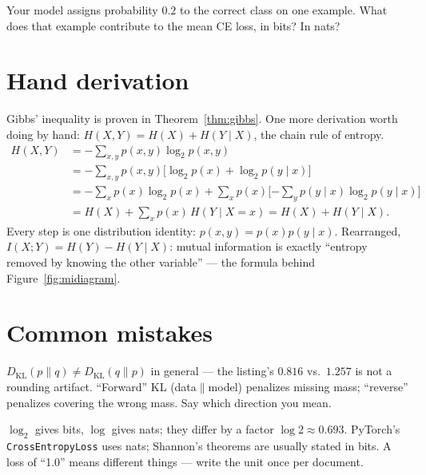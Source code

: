 \begin{exercise}[easy]
Your model assigns probability $0.2$ to the correct class on one
example. What does that example contribute to the mean CE loss, in
bits? In nats?
\end{exercise}

\section{Hand derivation}\label{sec:handderiv15}

Gibbs' inequality is proven in Theorem~\ref{thm:gibbs}. One more
derivation worth doing by hand: $H(X,Y)=H(X)+H(Y\mid X)$, the chain
rule of entropy.
\[
\begin{aligned}
H(X,Y)
&= -\sum_{x,y}p(x,y)\log_2 p(x,y)\\
&= -\sum_{x,y}p(x,y)\big[\log_2 p(x) + \log_2 p(y\mid x)\big]\\
&= -\sum_x p(x)\log_2 p(x)
   + \sum_x p(x)\Big[{-\sum_y p(y\mid x)\log_2 p(y\mid x)}\Big]\\
&= H(X) + \sum_x p(x)\,H(Y\mid X{=}x)
 = H(X) + H(Y\mid X).
\end{aligned}
\]
Every step is one distribution identity: $p(x,y)=p(x)p(y\mid x)$.
Rearranged, $I(X;Y)=H(Y)-H(Y\mid X)$: mutual information is exactly
``entropy removed by knowing the other variable'' --- the formula
behind Figure~\ref{fig:midiagram}.

\section{Common mistakes}\label{sec:info-mistakes}

\begin{tripwire}
$D_{\mathrm{KL}}(p\|q)\ne D_{\mathrm{KL}}(q\|p)$ in general ---
the listing's $0.816$ vs.\ $1.257$ is not a rounding artifact.
``Forward'' KL (data$\|$model) penalizes missing mass; ``reverse''
penalizes covering the wrong mass. Say which direction you mean.
\end{tripwire}

\begin{tripwire}
$\log_2$ gives bits, $\log$ gives nats; they differ by a factor
$\log 2\approx0.693$. PyTorch's \texttt{CrossEntropyLoss} uses nats;
Shannon's theorems are usually stated in bits. A loss of ``1.0'' means
different things --- write the unit once per document.
\end{tripwire}

